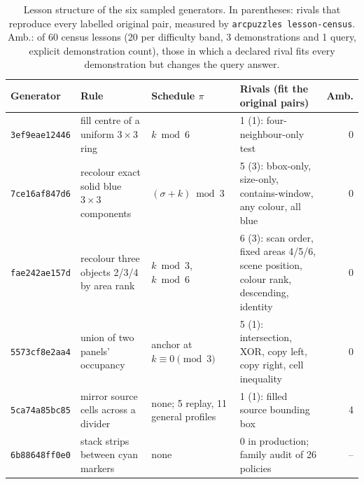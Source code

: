 \documentclass[11pt]{article}
\newcommand{\gen}[1]{\texttt{#1}}
\begin{document}
\begin{table}[H]
\centering
\small
\begin{tabularx}{\linewidth}{lXlXr}
\toprule
Generator & Rule & Schedule $\pi$ & Rivals (fit the original pairs) & Amb. \\
\midrule
\gen{3ef9eae12446} & fill centre of a uniform $3\times3$ ring & $k \bmod 6$ & 1 (1): four-neighbour-only test & 0 \\
\gen{7ce16af847d6} & recolour exact solid blue $3\times3$ components & $(\sigma+k)\bmod 3$ & 5 (3): bbox-only, size-only, contains-window, any colour, all blue & 0 \\
\gen{fae242ae157d} & recolour three objects 2/3/4 by area rank & $k \bmod 3$, $k \bmod 6$ & 6 (3): scan order, fixed areas 4/5/6, scene position, colour rank, descending, identity & 0 \\
\gen{5573cf8e2aa4} & union of two panels' occupancy & anchor at $k\equiv0 \pmod 3$ & 5 (1): intersection, XOR, copy left, copy right, cell inequality & 0 \\
\gen{5ca74a85bc85} & mirror source cells across a divider & none; 5 replay, 11 general profiles & 1 (1): filled source bounding box & 4 \\
\gen{6b88648ff0e0} & stack strips between cyan markers & none & 0 in production; family audit of 26 policies & -- \\
\bottomrule
\end{tabularx}
\caption{Lesson structure of the six sampled generators. In parentheses: rivals
that reproduce every labelled original pair, measured by
\texttt{arcpuzzles lesson-census}. Amb.: of 60 census lessons (20 per difficulty
band, 3 demonstrations and 1 query, explicit demonstration count), those in which
a declared rival fits every demonstration but changes the query answer.}
\end{table}
\end{document}
